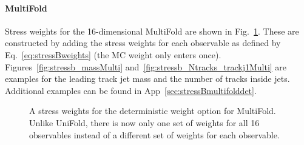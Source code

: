 \documentclass[NOTE, atlasdraft=true, texlive=2016, UKenglish]{\ATLASLATEXPATH atlasdoc}
\begin{document}
\clearpage

\paragraph{MultiFold} Stress weights for the 16-dimensional MultiFold are shown in Fig.~\ref{fig:stressb_weightsMulti}.  These are constructed by adding the stress weights for each observable as defined by Eq.~\ref{eq:stressBweights} (the MC weight only enters once).  Figures~\ref{fig:stressb_massMulti} and~\ref{fig:stressb_Ntracks_trackj1Multi} are examples for the leading track jet mass and the number of tracks inside jets.  Additional examples can be found in App~\ref{sec:stressBmultifolddet}.

\begin{figure}[h!]
\centering
{}
\caption{A stress weights for the deterministic weight option for MultiFold.  Unlike UniFold, there is now only one set of weights for all 16 observables instead of a different set of weights for each observable.}
\label{fig:stressb_weightsMulti}
\end{figure}
\end{document}
